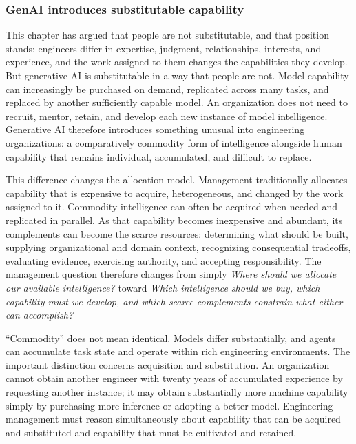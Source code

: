 \subsubsection{GenAI introduces substitutable capability}\label{sec-genai-substitutable}

This chapter has argued that people are not substitutable, and that position stands: engineers
differ in expertise, judgment, relationships, interests, and experience, and the work assigned to
them changes the capabilities they develop. But generative AI is substitutable in a way that people
are not. Model capability can increasingly be purchased on demand, replicated across many tasks,
and replaced by another sufficiently capable model. An organization does not need to recruit,
mentor, retain, and develop each new instance of model intelligence. Generative AI therefore
introduces something unusual into engineering organizations: a comparatively commodity form of
intelligence alongside human capability that remains individual, accumulated, and difficult to
replace.

This difference changes the allocation model. Management traditionally allocates capability that is
expensive to acquire, heterogeneous, and changed by the work assigned to it. Commodity intelligence
can often be acquired when needed and replicated in parallel. As that capability becomes
inexpensive and abundant, its complements can become the scarce resources: determining what should
be built, supplying organizational and domain context, recognizing consequential tradeoffs,
evaluating evidence, exercising authority, and accepting responsibility. The management question
therefore changes from simply \emph{Where should we allocate our available intelligence?} toward \emph{Which
intelligence should we buy, which capability must we develop, and which scarce complements
constrain what either can accomplish?}

``Commodity'' does not mean identical. Models differ substantially, and agents can accumulate task
state and operate within rich engineering environments. The important distinction concerns
acquisition and substitution. An organization cannot obtain another engineer with twenty years of
accumulated experience by requesting another instance; it may obtain substantially more machine
capability simply by purchasing more inference or adopting a better model. Engineering management
must reason simultaneously about capability that can be acquired and substituted and capability
that must be cultivated and retained.

